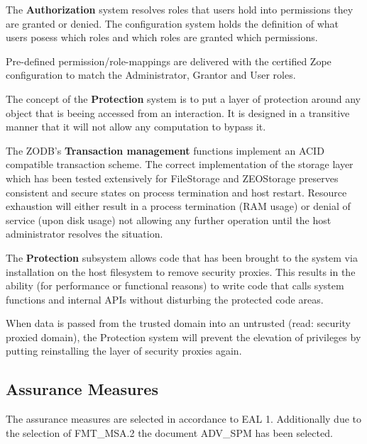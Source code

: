 \documentclass[12pt,english]{scrbook}
\begin{document}

The \textbf{Authorization} system resolves roles that users hold into
permissions they are granted or denied. The configuration system holds the
definition of what users posess which roles and which roles are granted which
permissions.

Pre-defined permission/role-mappings are delivered with the certified Zope
configuration to match the Administrator, Grantor and User roles. 


The concept of the \textbf{Protection} system is to put a layer of protection
around any object that is beeing accessed from an interaction. It is designed
in a transitive manner that it will not allow any computation to bypass it.


The ZODB's \textbf{Transaction management} functions implement an ACID
compatible transaction scheme. The correct implementation of the storage layer
which has been tested extensively for FileStorage and ZEOStorage preserves
consistent and secure states on process termination and host restart. Resource
exhaustion will either result in a process termination (RAM usage) or denial of
service (upon disk usage) not allowing any further operation until the host
administrator resolves the situation.


The \textbf{Protection} subsystem allows code that has been brought to the
system via installation on the host filesystem to remove security proxies. This
results in the ability (for performance or functional reasons) to write code
that calls system functions and internal APIs without disturbing the protected
code areas.

When data is passed from the trusted domain into an untrusted (read: security
proxied domain), the Protection system will prevent the elevation of privileges
by putting reinstalling the layer of security proxies again.

\subsection{Assurance Measures}

The assurance measures are selected in accordance to EAL 1. Additionally due to
the selection of FMT\_MSA.2 the document ADV\_SPM has been selected.
\end{document}
